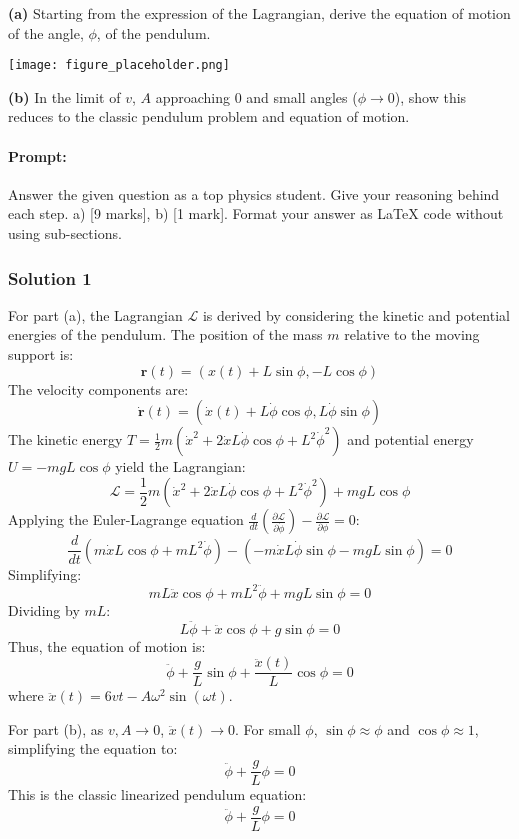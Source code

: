 \documentclass{article}
\begin{document}
\textbf{(a)} Starting from the expression of the Lagrangian, derive the equation of motion of the angle, $\phi$, of the pendulum.

\begin{center}
\texttt{[image: figure\_placeholder.png]}
\end{center}

\textbf{(b)} In the limit of $v$, $A$ approaching 0 and small angles ($\phi \to 0$), show this reduces to the classic pendulum problem and equation of motion.

\paragraph{Prompt: \\} 
Answer the given question as a top physics student. Give your reasoning behind each step. a) [9 marks], b) [1 mark].
Format your answer as LaTeX code without using sub-sections.

\subsubsection{Solution 1}
For part (a), the Lagrangian \( \mathcal{L} \) is derived by considering the kinetic and potential energies of the pendulum. The position of the mass \( m \) relative to the moving support is:
\[
\mathbf{r}(t) = \left( x(t) + L \sin\phi, -L \cos\phi \right)
\]
The velocity components are:
\[
\dot{\mathbf{r}}(t) = \left( \dot{x}(t) + L \dot{\phi} \cos\phi, L \dot{\phi} \sin\phi \right)
\]
The kinetic energy \( T = \frac{1}{2}m \left( \dot{x}^2 + 2 \dot{x} L \dot{\phi} \cos\phi + L^2 \dot{\phi}^2 \right) \) and potential energy \( U = -mgL \cos\phi \) yield the Lagrangian:
\[
\mathcal{L} = \frac{1}{2}m \left( \dot{x}^2 + 2 \dot{x} L \dot{\phi} \cos\phi + L^2 \dot{\phi}^2 \right) + mgL \cos\phi
\]
Applying the Euler-Lagrange equation \( \frac{d}{dt}\left(\frac{\partial \mathcal{L}}{\partial \dot{\phi}}\right) - \frac{\partial \mathcal{L}}{\partial \phi} = 0 \):
\[
\frac{d}{dt}\left( m\dot{x}L \cos\phi + mL^2 \dot{\phi} \right) - \left( -m\dot{x}L \dot{\phi} \sin\phi - mgL \sin\phi \right) = 0
\]
Simplifying:
\[
mL \ddot{x} \cos\phi + mL^2 \ddot{\phi} + mgL \sin\phi = 0
\]
Dividing by \( mL \):
\[
L \ddot{\phi} + \ddot{x} \cos\phi + g \sin\phi = 0
\]
Thus, the equation of motion is:
\[
\boxed{ \ddot{\phi} + \frac{g}{L} \sin\phi + \frac{\ddot{x}(t)}{L} \cos\phi = 0 }
\]
where \( \ddot{x}(t) = 6vt - A\omega^2 \sin(\omega t) \).

For part (b), as \( v, A \to 0 \), \( \ddot{x}(t) \to 0 \). For small \( \phi \), \( \sin\phi \approx \phi \) and \( \cos\phi \approx 1 \), simplifying the equation to:
\[
\ddot{\phi} + \frac{g}{L} \phi = 0
\]
This is the classic linearized pendulum equation:
\[
\boxed{ \ddot{\phi} + \frac{g}{L} \phi = 0 }
\]
\end{document}
